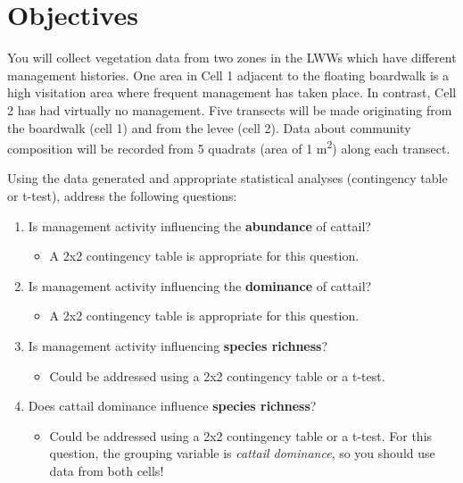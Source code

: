 \documentclass[]{book}
\providecommand{\tightlist}{%
  \setlength{\itemsep}{0pt}\setlength{\parskip}{0pt}}
\theoremstyle{definition}
\theoremstyle{definition}
\theoremstyle{definition}
\theoremstyle{remark}
\begin{document}
\section{Objectives}\label{objectives-2}

You will collect vegetation data from two zones in the LWWs which have
different management histories. One area in Cell 1 adjacent to the
floating boardwalk is a high visitation area where frequent management
has taken place. In contrast, Cell 2 has had virtually no management.
Five transects will be made originating from the boardwalk (cell 1) and
from the levee (cell 2). Data about community composition will be
recorded from 5 quadrats (area of 1 m\textsuperscript{2}) along each
transect.

\pagebreak
Using the data generated and appropriate statistical analyses
(contingency table or t-test), address the following questions:

\begin{enumerate}
\def\labelenumi{\arabic{enumi}.}
\tightlist
\item
  Is management activity influencing the \textbf{abundance} of cattail?

  \begin{itemize}
  \tightlist
  \item
    A 2x2 contingency table is appropriate for this question.
  \end{itemize}
\item
  Is management activity influencing the \textbf{dominance} of cattail?

  \begin{itemize}
  \tightlist
  \item
    A 2x2 contingency table is appropriate for this question.
  \end{itemize}
\item
  Is management activity influencing \textbf{species richness}?

  \begin{itemize}
  \tightlist
  \item
    Could be addressed using a 2x2 contingency table or a t-test.
  \end{itemize}
\item
  Does cattail dominance influence \textbf{species richness}?

  \begin{itemize}
  \tightlist
  \item
    Could be addressed using a 2x2 contingency table or a t-test. For
    this question, the grouping variable is \emph{cattail dominance}, so
    you should use data from both cells!
  \end{itemize}
\end{enumerate}
\end{document}
